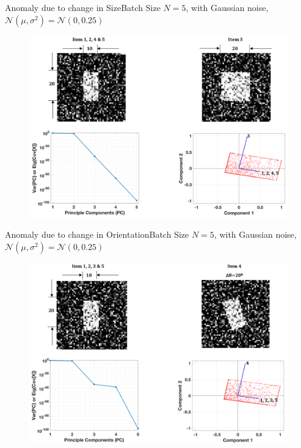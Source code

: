 \documentclass{beamer}
\begin{document}
\begin{frame}{Anomaly due to change in Size}{Batch Size $N = 5$, with Gaussian noise, $\mathcal{N}(\mu,\sigma^2)=\mathcal{N}(0,0.25)$}
  \begin{figure}
    \includegraphics[width=1\textheight]{N5_Size_Detection}
  \end{figure}
\end{frame}

\begin{frame}{Anomaly due to change in Orientation}{Batch Size $N = 5$, with Gaussian noise, $\mathcal{N}(\mu,\sigma^2)=\mathcal{N}(0,0.25)$}
  \begin{figure}
    \includegraphics[width=1\textheight]{N5_Orientation_Detection}
  \end{figure}
\end{frame}
\end{document}
